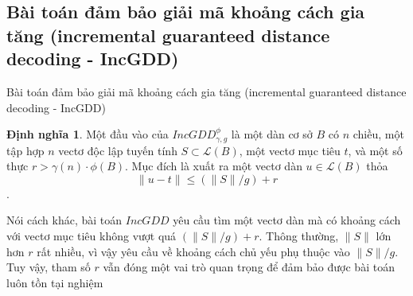 \documentclass[notheorems,envcountsect,serif,12pt]{beamer}
\providecommand{\norm}[1]{\lVert#1\rVert}
\numberwithin{equation}{section}
\theoremstyle{definition}
\newtheorem{definition}[theorem]{Định nghĩa}
\numberwithin{equation}{section}
\begin{document}
\subsection[Bài toán đảm bảo giải mã khoảng cách gia tăng]{Bài toán đảm bảo giải mã khoảng cách gia tăng (incremental guaranteed distance decoding - IncGDD)}\label{IncGDD}
\begin{frame}{Bài toán đảm bảo giải mã khoảng cách gia tăng (incremental guaranteed distance decoding - IncGDD)}
	\begin{definition}
		Một đầu vào của $IncGDD_{\gamma, g}^{\phi}$ là một dàn cơ sở $B$ có $n$ chiều, một tập hợp $n$ vectơ độc lập tuyến tính $S\subset \mathcal{L}(B)$, một vectơ mục tiêu $t$, và một số thực $r>\gamma(n)\cdot \phi(B)$. Mục đích là xuất ra một vectơ dàn $u\in \mathcal{L}(B)$ thỏa $$\norm{u-t}\le \left(\norm{S}/g\right)+r$$.
	\end{definition}\pause
	Nói cách khác, bài toán $IncGDD$ yêu cầu tìm một vectơ dàn mà có khoảng cách với vectơ mục tiêu không vượt quá $\left(\norm{S}/g\right)+r$. Thông thường, $\norm{S}$ lớn hơn $r$ rất nhiều, vì vậy yêu cầu về khoảng cách chủ yếu phụ thuộc vào $\norm{S}/g$. Tuy vậy, tham số $r$ vẫn đóng một vai trò quan trọng để đảm bảo được bài toán luôn tồn tại nghiệm
\end{frame}
\end{document}
